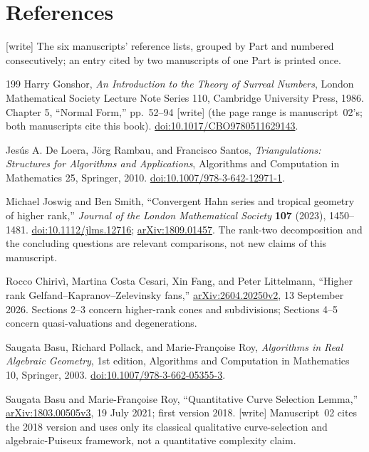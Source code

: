 \documentclass[11pt,a4paper]{article}
\numberwithin{equation}{section}
\theoremstyle{plain}
\newcommand{\wtag}{\textup{[write]}}%
\newcounter{polybibc}
\newenvironment{polybiblist}[1]{\let\section\subsection\renewcommand{\refname}{#1}%
 \begin{thebibliography}{199}\setcounter{enumiv}{\value{polybibc}}}%
 {\setcounter{polybibc}{\value{enumiv}}\end{thebibliography}}
\begin{document}
\clearpage
\section*{References}
\noindent\wtag{} The six manuscripts' reference lists, grouped by Part and
numbered consecutively; an entry cited by two manuscripts of one Part is
printed once.

\begin{polybiblist}{Parts I and II (manuscripts 05 and 02)}
\small
{}
Harry Gonshor, \emph{An Introduction to the Theory of Surreal Numbers},
London Mathematical Society Lecture Note Series 110, Cambridge University
Press, 1986. Chapter 5, ``Normal Form,'' pp.~52--94 \wtag{} (the page range is manuscript~02's; both manuscripts cite this book).
\href{https://doi.org/10.1017/CBO9780511629143}{doi:10.1017/CBO9780511629143}.

Jes\'us A. De Loera, J\"org Rambau, and Francisco Santos,
\emph{Triangulations: Structures for Algorithms and Applications},
Algorithms and Computation in Mathematics 25, Springer, 2010.
\href{https://doi.org/10.1007/978-3-642-12971-1}{doi:10.1007/978-3-642-12971-1}.

Michael Joswig and Ben Smith, ``Convergent Hahn series and tropical geometry
of higher rank,'' \emph{Journal of the London Mathematical Society}
\textbf{107} (2023), 1450--1481.
\href{https://doi.org/10.1112/jlms.12716}{doi:10.1112/jlms.12716};
\href{https://arxiv.org/abs/1809.01457}{arXiv:1809.01457}.
The rank-two decomposition and the concluding questions are relevant
comparisons, not new claims of this manuscript.

Rocco Chiriv\`i, Martina Costa Cesari, Xin Fang, and Peter Littelmann,
``Higher rank Gelfand--Kapranov--Zelevinsky fans,''
\href{https://arxiv.org/abs/2604.20250v2}{arXiv:2604.20250v2},
13 September 2026. Sections 2--3 concern higher-rank cones and subdivisions;
Sections 4--5 concern quasi-valuations and degenerations.

Saugata Basu, Richard Pollack, and Marie-Fran\c{c}oise Roy,
\emph{Algorithms in Real Algebraic Geometry}, 1st edition,
Algorithms and Computation in Mathematics 10, Springer, 2003.
\href{https://doi.org/10.1007/978-3-662-05355-3}{doi:10.1007/978-3-662-05355-3}.

Saugata Basu and Marie-Fran\c{c}oise Roy,
``Quantitative Curve Selection Lemma,''
\href{https://arxiv.org/abs/1803.00505v3}{arXiv:1803.00505v3},
19 July 2021; first version 2018. \wtag{} Manuscript~02 cites the 2018 version and uses only its classical qualitative curve-selection and algebraic-Puiseux framework, not a quantitative complexity claim.


\end{polybiblist}
\end{document}
